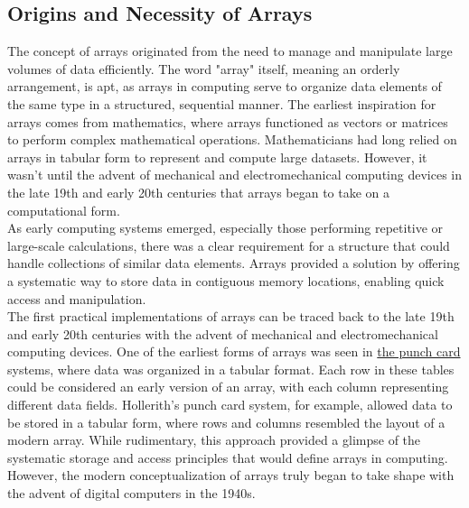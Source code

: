 \documentclass[12pt, oneside]{book}
\begin{document}
	\subsection{Origins and Necessity of Arrays}
	The concept of arrays originated from the need to manage and manipulate large volumes of data efficiently. The word "array" itself, meaning an orderly arrangement, is apt, as arrays in computing serve to organize data elements of the same type in a structured, sequential manner. The earliest inspiration for arrays comes from mathematics, where arrays functioned as vectors or matrices to perform complex mathematical operations. Mathematicians had long relied on arrays in tabular form to represent and compute large datasets. However, it wasn’t until the advent of mechanical and electromechanical computing devices in the late 19th and early 20th centuries that arrays began to take on a computational form. \\ As early computing systems emerged, especially those performing repetitive or large-scale calculations, there was a clear requirement for a structure that could handle collections of similar data elements. Arrays provided a solution by offering a systematic way to store data in contiguous memory locations, enabling quick access and manipulation.\\The first practical implementations of arrays can be traced back to the late 19th and early 20th centuries with the advent of mechanical and electromechanical computing devices. One of the earliest forms of arrays was seen in \href{https://en.wikipedia.org/wiki/Punched_card}{the punch card} systems, where data was organized in a tabular format. Each row in these tables could be considered an early version of an array, with each column representing different data fields. Hollerith's punch card system, for example, allowed data to be stored in a tabular form, where rows and columns resembled the layout of a modern array. While rudimentary, this approach provided a glimpse of the systematic storage and access principles that would define arrays in computing. However, the modern conceptualization of arrays truly began to take shape with the advent of digital computers in the 1940s.
\end{document}
